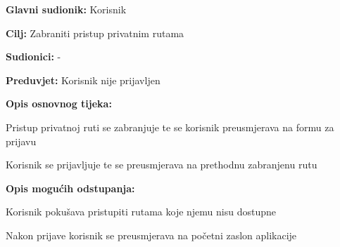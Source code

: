 \noindent {}
\begin{packed_item}
	
	\item \textbf{Glavni sudionik:} Korisnik
	\item \textbf{Cilj:} Zabraniti pristup privatnim rutama
	\item \textbf{Sudionici:} -
	\item \textbf{Preduvjet:} Korisnik nije prijavljen
	\item \textbf{Opis osnovnog tijeka:}
	
	\item[] \begin{packed_enum}
		
		\item Pristup privatnoj ruti se zabranjuje te se korisnik preusmjerava na formu za prijavu
		\item Korisnik se prijavljuje te se preusmjerava na prethodnu zabranjenu rutu
	\end{packed_enum}
	
	\item  \textbf{Opis mogućih odstupanja:}
	
	\item[] \begin{packed_item}
		
		\item[2.a] Korisnik pokušava pristupiti rutama koje njemu nisu dostupne
		\item[] \begin{packed_enum}
			
			\item Nakon prijave korisnik se preusmjerava na početni zaslon aplikacije
			
		\end{packed_enum}
		
	\end{packed_item}
\end{packed_item}

